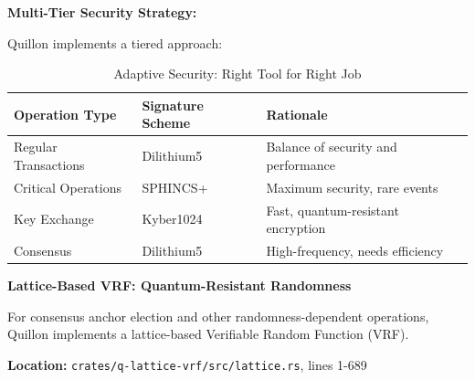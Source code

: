 \documentclass[11pt,a4paper]{article}
\begin{document}
\textbf{Multi-Tier Security Strategy:}

Quillon implements a tiered approach:
\begin{table}[h]
\centering
\begin{tabular}{@{}lll@{}}
\toprule
\textbf{Operation Type} & \textbf{Signature Scheme} & \textbf{Rationale} \\ \midrule
Regular Transactions & Dilithium5 & Balance of security and performance \\
Critical Operations & SPHINCS+ & Maximum security, rare events \\
Key Exchange & Kyber1024 & Fast, quantum-resistant encryption \\
Consensus & Dilithium5 & High-frequency, needs efficiency \\
\bottomrule
\end{tabular}
\caption{Adaptive Security: Right Tool for Right Job}
\end{table}

\textbf{Lattice-Based VRF: Quantum-Resistant Randomness}

For consensus anchor election and other randomness-dependent operations, Quillon implements a lattice-based Verifiable Random Function (VRF).

\textbf{Location:} \texttt{crates/q-lattice-vrf/src/lattice.rs}, lines 1-689
\end{document}

